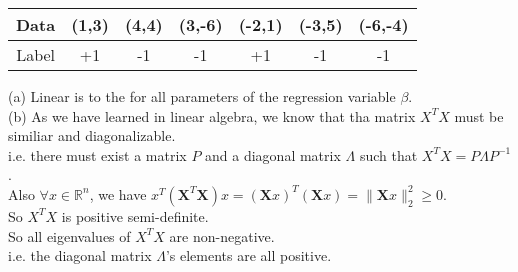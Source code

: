 \documentclass[10pt]{article}
\begin{document}
\begin{enumerate}[1.]
\begin{itemize}
			\begin{table}[h]
				\centering
				\begin{tabular}{c|cccccc}
					Data & (1,3) & (4,4) & (3,-6) & (-2,1) & (-3,5) & (-6,-4) \\ \hline
					Label & +1 & -1 & -1 & +1 & -1 & -1
				\end{tabular}
				\label{tab:my_label}
			\end{table}
	      \end{itemize}
      	  
(a) Linear is to the for all parameters of the regression variable $\beta$.\\

(b) As we have learned in linear algebra, we know that tha matrix
$X^TX$ must be similiar and diagonalizable.\\
i.e. there must exist a matrix $P$ and a diagonal matrix $\Lambda$ such that $X^TX=P\Lambda P^{-1}$.\\
Also $\forall x\in\mathbb{R}^n$, we have $x^T(\mathbf{X}^T\mathbf{X}) x=(\mathbf{X}x)^T(\mathbf{X}x)=\|\mathbf{X}x\|_2^2\geq0$.\\
So $X^TX$ is positive semi-definite.\\
So all eigenvalues of $X^TX$ are non-negative.\\
i.e. the diagonal matrix $\Lambda$'s elements are all positive.


\end{enumerate}
\end{document}
